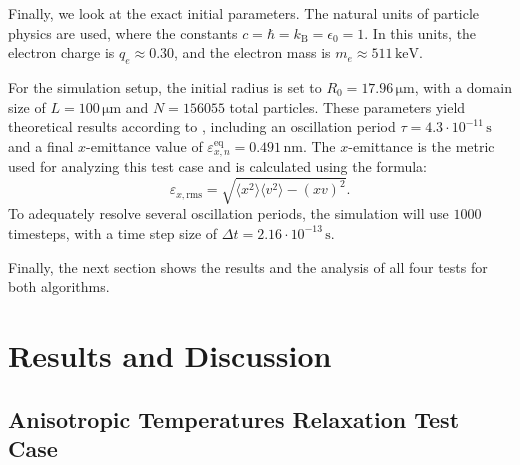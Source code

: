 \begin{description}
    Finally, we look at the exact initial parameters. The natural units of particle physics are used, where the constants $ c = \hbar = k_\mathrm{B} = \epsilon_0 = 1$. In this units, the electron charge is $ q_e \approx 0.30 $, and the electron mass is  $m_e \approx 511\,\si{\kilo\electronvolt}$.

    For the simulation setup, the initial radius is set to $R_0 = 17.96\,\si{\micro\metre}$, with a domain size of $L = 100\,\si{\micro\metre}$ and $N = 156055$ total particles. These parameters yield theoretical results according to \cite[595]{Mitchell2015}, including an oscillation period $\tau = 4.3 \cdot 10^{-11}\,\si{\second}$ and a final $x$-emittance value of $\varepsilon_{x,n}^\mathrm{eq} = 0.491 \,\si{\nano\metre}$. The $x$-emittance is the metric used for analyzing this test case and is calculated using the formula:
    $$
    \varepsilon_{x, \mathrm{rms}} = \sqrt{\langle x^2 \rangle \langle v^2 \rangle - (xv)^2}.
    $$
    To adequately resolve several oscillation periods, the simulation will use $1000$ timesteps, with a time step size of $\Delta t = 2.16\cdot 10^{-13}\,\si{\second}$.
\end{description}
Finally, the next section shows the results and the analysis of all four tests for both algorithms. 


\section{Results and Discussion}

\subsection{Anisotropic Temperatures Relaxation Test Case}\label{sec:result:trubnikov}

